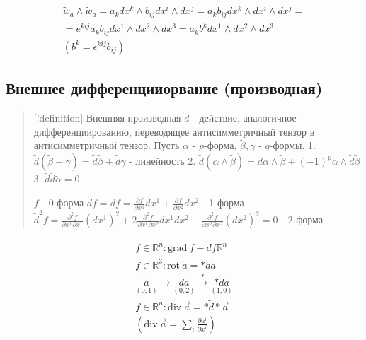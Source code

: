 $$\begin{gather}
\tilde{w}_{a} \wedge \tilde{w}_{a} = a_{k}dx^{k} \wedge b_{ij}dx^{i} \wedge dx^{j} = a_{k}b_{ij}dx^{k}\wedge dx^{i} \wedge dx^{j} = \\
= e^{kij}a_{k}b_{ij} dx^{1}\wedge dx^{2} \wedge dx^{3} = a_{k}b^{k}dx^{1}\wedge dx^{2} \wedge dx^{3} \\
(b^{k} = \epsilon^{kij}b_{ij})
\end{gather}$$

\subsection{Внешнее дифференцииорвание
(производная)}

\begin{quote}
{[}!definition{]} Внешняя производная \(\tilde{d}\) - действие,
аналогичное дифференциированию, переводящее антисимметричный тензор в
антисимметричный тензор. Пусть \(\tilde{\alpha}\) - \(p\)-форма,
\(\tilde{\beta},\tilde{\gamma}\) - \(q\)-формы. 1.
\(\tilde{d}(\tilde{\beta} + \tilde{\gamma}) = \tilde{d}\tilde{\beta} + \tilde{d}\tilde{\gamma}\)
- линейность 2.
\(\tilde{d}(\tilde{\alpha} \wedge \tilde{\beta}) = d\tilde{\alpha} \wedge \tilde{\beta} + (-1)^{p} \tilde{\alpha} \wedge \tilde{d}\tilde{\beta}\)
3. \(\tilde{d}\tilde{d}\tilde{\alpha} = 0\)

\(f\) - 0-форма
\(\tilde{d}f = df = \frac{\partial f}{\partial x^{1}}dx^{1} + \frac{\partial f}{\partial x^{2}}dx^{2}\)
- 1-форма
\(\tilde{d}^{2}f = \frac{\partial^{2} f}{\partial x^{1}\partial x^{1}}(dx^{1})^{2} + 2\frac{\partial^{2} f}{\partial x^{1}\partial x^{2}}dx^{1}dx^{2} + \frac{\partial^{2} f}{\partial x^{2}\partial x^{2}}(dx^{2})^{2} = 0\)
- 2-форма
\end{quote}

$$\begin{gather}
f \in \mathbb{R}^{n}: \mathrm{grad} \ f - \tilde{d}f \mathbb{R}^{n} \\
f \in \mathbb{R}^{3}: \mathrm{rot} \ \tilde{a} = *\tilde{d}\tilde{a} \\
\underset{(0,1)}{\tilde{a}} \to \underset{(0,2)}{\tilde{d}\tilde{a}} \overset{*}{\to} \underset{(1,0)}{*\tilde{d}\tilde{a}} \\
f \in \mathbb{R}^{n} : \mathrm{div} \ \vec{a} = *\tilde{d}*\vec{a} \\
\left( \mathrm{div} \ \vec{a} = \sum_{i} \frac{\partial a^{i}}{\partial x^{i}} \right)
\end{gather}$$

